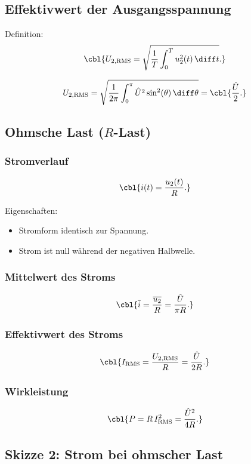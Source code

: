 \subsection{Effektivwert der Ausgangsspannung}

Definition:
\[
\cbl{U_{2,\mathrm{RMS}} = \sqrt{\frac{1}{T} \int_0^T u_2^2(t)\,\diff t}.}
\]

\[
U_{2,\mathrm{RMS}}
= \sqrt{ \frac{1}{2\pi} \int_0^\pi \hat U^2 \sin^2(\theta)\,\diff \theta }
= \cbl{\frac{\hat U}{2}.}
\]

\subsection{Ohmsche Last ($R$-Last)}

\subsubsection{Stromverlauf}

\[
\cbl{i(t) = \frac{u_2(t)}{R}.}
\]

Eigenschaften:
\begin{itemize}
    \item Stromform identisch zur Spannung.
    \item Strom ist null während der negativen Halbwelle.
\end{itemize}

\subsubsection{Mittelwert des Stroms}

\[
\cbl{\overline{i} = \frac{\overline{u_2}}{R} = \frac{\hat U}{\pi R}.}
\]

\subsubsection{Effektivwert des Stroms}

\[
\cbl{I_{\mathrm{RMS}} = \frac{U_{2,\mathrm{RMS}}}{R} = \frac{\hat U}{2R}.}
\]

\subsubsection{Wirkleistung}

\[
\cbl{P = R \, I_{\mathrm{RMS}}^2 = \frac{\hat U^2}{4R}.}
\]

\subsection{Skizze 2: Strom bei ohmscher Last}

